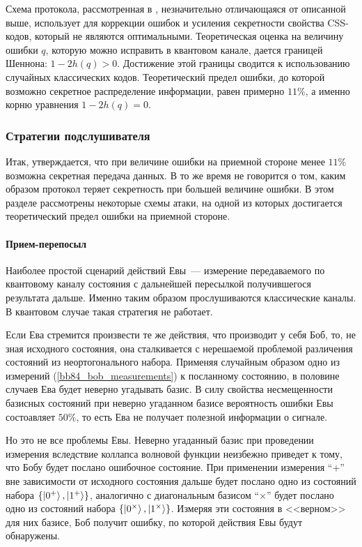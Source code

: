 Схема протокола, рассмотренная в \cite{protocol_css}, незначительно отличающаяся от описанной выше, использует для коррекции ошибок и усиления секретности свойства CSS-кодов, который не являются оптимальными. Теоретическая оценка на величину ошибки $q$, которую можно исправить в квантовом канале, дается границей Шеннона: $1-2h(q) > 0$. 
Достижение этой границы сводится к использованию случайных классических кодов. Теоретический предел ошибки, до которой возможно секретное распределение информации, равен примерно $11\%$, а именно корню уравнения $1 - 2h(q) = 0$.

\subsubsection{Стратегии подслушивателя}
Итак, утверждается, что при величине ошибки на приемной стороне менее $11\%$ возможна секретная передача данных. В то же время не говорится о том, каким образом протокол теряет секретность при большей величине ошибки. В этом разделе рассмотрены некоторые схемы атаки, на одной из которых достигается теоретический предел ошибки на приемной стороне.
\paragraph{Прием-перепосыл}
Наиболее простой сценарий действий Евы~--- измерение передаваемого по квантовому каналу состояния с дальнейшей пересылкой получившегося результата дальше. Именно таким образом прослушиваются классические каналы. В квантовом случае такая стратегия не работает.

Если Ева стремится произвести те же действия, что производит у себя Боб, то, не зная исходного состояния, она сталкивается с нерешаемой проблемой различения состояний из неортогонального набора. 
Применяя случайным образом одно из измерений (\ref{bb84_bob_measurements})
к посланному состоянию, в половине случаев Ева будет неверно угадывать базис. В силу свойства несмещенности базисных состояний при неверно угаданном базисе вероятность ошибки Евы состоавляет $50\%$, то есть Ева не получает полезной информации о сигнале.

Но это не все проблемы Евы. Неверно угаданный базис при проведении измерения вследствие коллапса волновой функции неизбежно приведет к тому, что Бобу будет послано ошибочное состояние. При применении измерения ``$+$'' вне зависимости от исходного состояния дальше будет послано одно из состояний набора $\{\left| 0^+ \right\rangle, \left| 1^+ \right\rangle\}$, аналогично с диагональным базисом ``$\times$'' будет послано одно из состояний набора $\{\left| 0^\times \right\rangle, \left| 1^\times \right\rangle\}$. Измеряя эти состояния в <<верном>> для них базисе, Боб получит ошибку, по которой действия Евы будут обнаружены.

